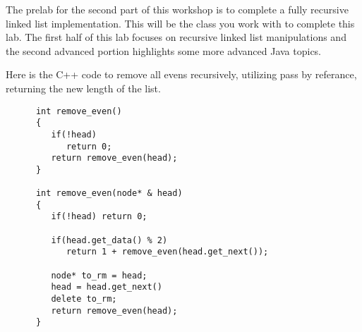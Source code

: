 \documentclass[../../main.tex]{subfiles}
\begin{document}
The prelab for the second part of this workshop is to complete a fully
recursive linked list implementation. This will be the class you work
with to complete this lab. The first half of this lab focuses on
recursive linked list manipulations and the second advanced portion
highlights some more advanced Java topics.

\begin{steps}
   \item Here is the C++ code to remove all evens recursively, utilizing pass by referance, returning the
      new length of the list.
      \begin{verbatim}
      int remove_even()
      {
         if(!head)
            return 0;
         return remove_even(head);
      }

      int remove_even(node* & head)
      {
         if(!head) return 0;

         if(head.get_data() % 2)
            return 1 + remove_even(head.get_next());

         node* to_rm = head;
         head = head.get_next()
         delete to_rm;
         return remove_even(head);
      }
      \end{verbatim}


\end{steps}
\end{document}

